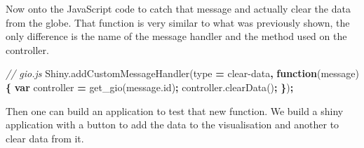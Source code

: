 \documentclass[
]{krantz}
\makeatletter
\newenvironment{Shaded}{\begin{snugshade}}{\end{snugshade}}
\newcommand{\AttributeTok}[1]{\textcolor[rgb]{0.61,0.61,0.61}{#1}}
\newcommand{\CommentTok}[1]{\textcolor[rgb]{0.37,0.37,0.37}{\textit{#1}}}
\newcommand{\KeywordTok}[1]{\textcolor[rgb]{0.27,0.27,0.27}{\textbf{#1}}}
\newcommand{\NormalTok}[1]{#1}
\newcommand{\OperatorTok}[1]{\textcolor[rgb]{0.43,0.43,0.43}{\textbf{#1}}}
\newcommand{\StringTok}[1]{\textcolor[rgb]{0.5,0.5,0.5}{#1}}
\newcommand{\VariableTok}[1]{\textcolor[rgb]{0,0,0}{#1}}
\newenvironment{kframe}{%
\medskip{}
\setlength{\fboxsep}{.8em}
 \def\at@end@of@kframe{}%
 \ifinner\ifhmode%
  \def\at@end@of@kframe{\end{minipage}}%
  \begin{minipage}{\columnwidth}%
 \fi\fi%
 \def\FrameCommand##1{\hskip\@totalleftmargin \hskip-\fboxsep
 \colorbox{shadecolor}{##1}\hskip-\fboxsep
     \hskip-\linewidth \hskip-\@totalleftmargin \hskip\columnwidth}%
 \MakeFramed {\advance\hsize-\width
   \@totalleftmargin\z@ \linewidth\hsize
   \@setminipage}}%
 {\par\unskip\endMakeFramed%
 \at@end@of@kframe}
\renewenvironment{Shaded}{\begin{kframe}}{\end{kframe}}
\makeatother
\begin{document}
Now onto the JavaScript code to catch that message and actually clear the data from the globe. That function is very similar to what was previously shown, the only difference is the name of the message handler and the method used on the controller.

\begin{Shaded}
\begin{Highlighting}[]
\CommentTok{// gio.js}
\VariableTok{Shiny}\NormalTok{.}\AttributeTok{addCustomMessageHandler}\NormalTok{(type }\OperatorTok{=} \StringTok{\textquotesingle{}clear{-}data\textquotesingle{}}\OperatorTok{,} \KeywordTok{function}\NormalTok{(message) }\OperatorTok{\{}
  \KeywordTok{var}\NormalTok{ controller }\OperatorTok{=} \AttributeTok{get\_gio}\NormalTok{(}\VariableTok{message}\NormalTok{.}\AttributeTok{id}\NormalTok{)}\OperatorTok{;}
  \VariableTok{controller}\NormalTok{.}\AttributeTok{clearData}\NormalTok{()}\OperatorTok{;}
\OperatorTok{\}}\NormalTok{)}\OperatorTok{;}
\end{Highlighting}
\end{Shaded}

Then one can build an application to test that new function. We build a shiny application with a button to add the data to the visualisation and another to clear data from it.
\end{document}
